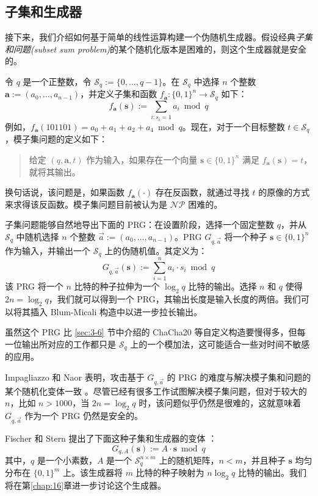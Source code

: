 \subsection{子集和生成器}\label{subsec:3-7-2}

接下来，我们介绍如何基于简单的线性运算构建一个伪随机生成器。假设经典\emph{子集和问题(subset sum problem)}的某个随机化版本是困难的，则这个生成器就是安全的。

\begin{snote}[模子集问题。]
令 $q$ 是一个正整数，令 $\mathcal{S}_q:=\{0,\dots,q-1\}$。在 $\mathcal{S}_q$ 中选择 $n$ 个整数 $\boldsymbol{a}:=(a_0,\dots,a_{n-1})$，并定义子集和函数 $f_{\boldsymbol{a}}:\{0,1\}^n\to\mathcal{S}_q$ 如下：
\[
f_{\boldsymbol{a}}(\boldsymbol{s})
:=\sum_{i: s_i=1}a_i\bmod q
\]
例如，$f_{\boldsymbol{a}}(101101)=a_0+a_1+a_2+a_4\bmod q$。现在，对于一个目标整数 $t\in\mathcal{S}_q$，模子集问题的定义如下：
\begin{quote}
给定 $(q,\boldsymbol{a},t)$ 作为输入，如果存在一个向量 $\boldsymbol{s}\in\{0,1\}^n$ 满足 $f_{\boldsymbol{a}}(\boldsymbol{s})=t$，就将其输出。
\end{quote}
换句话说，该问题是，如果函数 $f_{\boldsymbol{a}}(\cdot)$ 存在反函数，就通过寻找 $t$ 的原像的方式来求得该反函数。模子集问题目前被认为是 $\mathcal{NP}$ 困难的。
\end{snote}

\begin{snote}[子集和与PRG。]
子集问题能够自然地导出下面的 PRG：在设置阶段，选择一个固定整数 $q$，并从 $\mathcal{S}_q$ 中随机选择 $n$ 个整数 $\vec{a}:=(a_0,\dots,a_{n-1})$。PRG $G_{q,\vec{a}}$ 将一个种子 $\boldsymbol{s}\in\{0,1\}^n$ 作为输入，并输出一个 $\mathcal{S}_q$ 上的伪随机值。其定义为：
\[
G_{q,\vec{a}}(\boldsymbol{s})
:=\sum_{i=1}^na_i\cdot s_i\bmod q
\]
该 PRG 将一个 $n$ 比特的种子拉伸为一个 $\log_2q$ 比特的输出。选择 $n$ 和 $q$ 使得 $2n=\log_2q$，我们就可以得到一个 PRG，其输出长度是输入长度的两倍。我们可以将其插入 Blum-Micali 构造中以进一步拉长输出。

虽然这个 PRG 比 \ref{sec:3-6} 节中介绍的 ChaCha20 等自定义构造要慢得多，但每一位输出所对应的工作都只是 $\mathcal{S}_q$ 上的一个模加法，这可能适合一些对时间不敏感的应用。

Impagliazzo 和 Naor 表明，攻击基于 $G_{q,\vec{a}}$ 的 PRG 的难度与解决模子集和问题的某个随机化变体一致 \cite{impagliazzo1996efficient}。尽管已经有很多工作试图解决模子集问题，但对于较大的 $n$，比如 $n>1000$，当 $2n=\log_2q$ 时，该问题似乎仍然是很难的，这就意味着 $G_{q,\vec{a}}$ 作为一个 PRG 仍然是安全的。
\end{snote}

\begin{snote}[变体。]
Fischer 和 Stern 提出了下面这种子集和生成器的变体 \cite{fischer1996efficient}：
\[
G_{q,A}(\boldsymbol{s})
:=A\cdot\boldsymbol{s}\bmod q
\]
其中，$q$ 是一个小素数，$A$ 是一个 $\mathcal{S}_q^{n\times m}$ 上的随机矩阵，$n<m$，并且种子 $\boldsymbol{s}$ 均匀分布在 $\{0,1\}^m$ 上。该生成器将 $m$ 比特的种子映射为 $n\log_2q$ 比特的输出。我们将在第\ref{chap:16}章进一步讨论这个生成器。
\end{snote}
